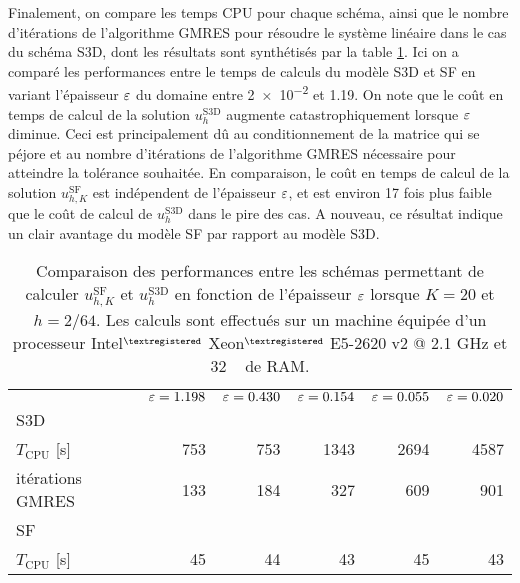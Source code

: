 Finalement, on compare les temps CPU pour chaque schéma, ainsi que le
nombre d'itérations de l'algorithme GMRES pour résoudre le système
linéaire dans le cas du schéma S3D, dont les résultats sont
synthétisés par la table \ref{tab:e-sf-e-s3d-cpu-cost}. Ici on a
comparé les performances entre le temps de calculs du modèle S3D et SF
en variant l'épaisseur $\varepsilon$ du domaine entre \num{2e-2} et
\num{1.19}. On note que le coût en temps de calcul de la solution
$u_h^\mathrm{S3D}$ augmente catastrophiquement lorsque $\varepsilon$
diminue. Ceci est principalement dû au conditionnement de la matrice
qui se péjore et au nombre d'itérations de l'algorithme GMRES
nécessaire pour atteindre la tolérance souhaitée. En comparaison, le
coût en temps de calcul de la solution $u_{h,K}^{\mathrm{SF}}$ est
indépendent de l'épaisseur $\varepsilon$, et est environ 17 fois plus
faible que le coût de calcul de $u_h^\mathrm{S3D}$ dans le pire des
cas. A nouveau, ce résultat indique un clair avantage du modèle SF par
rapport au modèle S3D.

\begin{table}[h!]
  \caption{Comparaison des performances entre les schémas permettant
    de calculer $u_{h,K}^{\mathrm{SF}}$ et $u_h^\mathrm{S3D}$ en
    fonction de l'épaisseur $\varepsilon$ lorsque $K = 20$ et $h =
    2/64$. Les calculs sont effectués sur un machine équipée d'un
    processeur Intel$^{\tiny{\textregistered}}$
    Xeon$^{\tiny{\textregistered}}$ E5-2620 v2 @ 2.1 \si{\giga\hertz}
    et 32 \si{\giga\octet} de RAM.}
  \label{tab:e-sf-e-s3d-cpu-cost}
  \begin{center}
    \begin{tabular}{@{}lrrrrr@{}}
      \toprule
      & $\varepsilon = 1.198$ & $\varepsilon = 0.430$ & $\varepsilon = 0.154$ & $\varepsilon = 0.055$ & $\varepsilon = 0.020$   \\
      \cmidrule{2-6}
      S3D  \\
      \hphantom{a} $T_\text{CPU}$ [\si{\second}] & 753 & 753 & 1343 & 2694 & 4587  \\
      \hphantom{a} itérations GMRES           & 133 & 184 & 327 & 609 & 901    \\
      SF \\
      \hphantom{a} $T_\text{CPU}$ [\si{\second}] & 45 & 44 & 43 & 45 & 43    \\
      \bottomrule
    \end{tabular}
  \end{center}
\end{table}
